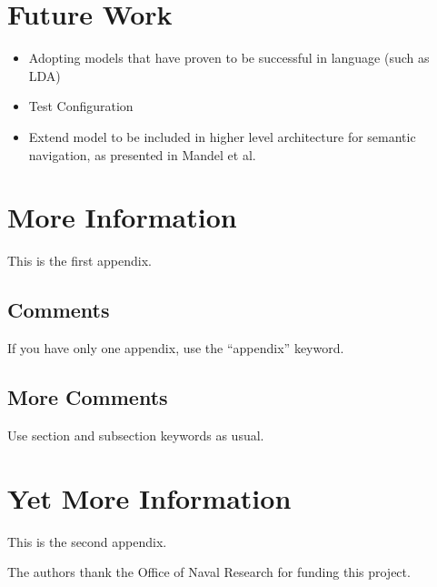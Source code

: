 \documentclass[twocolumn,letterpaper]{IEEEAerospaceCLS}  %
\begin{document}
\section{Future Work} \label{sec:Fut}
\begin{itemize}
    \item Adopting models that have proven to be successful in language (such as LDA)
    \item Test Configuration
    \item Extend model to be included in higher level architecture for semantic navigation, as presented in Mandel et al.~\cite{mandel_towards_2020}
\end{itemize}
\appendices{}              %

\section{More Information}        %
This is the first appendix.

\subsection{Comments}
If you have only one appendix, use the ``appendix'' keyword.

\subsection{More Comments}
Use section and subsection keywords as usual.

\section{Yet More Information}    %
This is the second appendix.



\acknowledgments
The authors thank the Office of Naval Research for funding this project.
\end{document}
